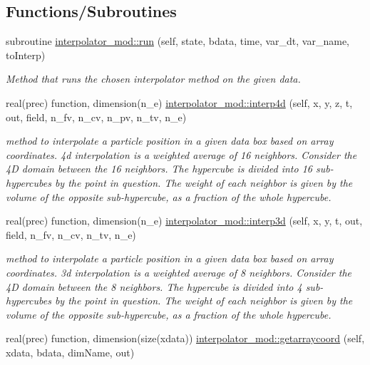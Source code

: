 \subsection*{Functions/\+Subroutines}
\begin{DoxyCompactItemize}
\item 
subroutine \mbox{\hyperlink{namespaceinterpolator__mod_aeb33b9e901668a304b49a9cc7e42969c}{interpolator\+\_\+mod\+::run}} (self, state, bdata, time, var\+\_\+dt, var\+\_\+name, to\+Interp)
\begin{DoxyCompactList}\small\item\em Method that runs the chosen interpolator method on the given data. \end{DoxyCompactList}\item 
real(prec) function, dimension(n\+\_\+e) \mbox{\hyperlink{namespaceinterpolator__mod_a4d21fa0242d7cf7742a44d85314ec183}{interpolator\+\_\+mod\+::interp4d}} (self, x, y, z, t, out, field, n\+\_\+fv, n\+\_\+cv, n\+\_\+pv, n\+\_\+tv, n\+\_\+e)
\begin{DoxyCompactList}\small\item\em method to interpolate a particle position in a given data box based on array coordinates. 4d interpolation is a weighted average of 16 neighbors. Consider the 4D domain between the 16 neighbors. The hypercube is divided into 16 sub-\/hypercubes by the point in question. The weight of each neighbor is given by the volume of the opposite sub-\/hypercube, as a fraction of the whole hypercube. \end{DoxyCompactList}\item 
real(prec) function, dimension(n\+\_\+e) \mbox{\hyperlink{namespaceinterpolator__mod_a15031a389a46159257dd4c2b15174a0b}{interpolator\+\_\+mod\+::interp3d}} (self, x, y, t, out, field, n\+\_\+fv, n\+\_\+cv, n\+\_\+tv, n\+\_\+e)
\begin{DoxyCompactList}\small\item\em method to interpolate a particle position in a given data box based on array coordinates. 3d interpolation is a weighted average of 8 neighbors. Consider the 4D domain between the 8 neighbors. The hypercube is divided into 4 sub-\/hypercubes by the point in question. The weight of each neighbor is given by the volume of the opposite sub-\/hypercube, as a fraction of the whole hypercube. \end{DoxyCompactList}\item 
real(prec) function, dimension(size(xdata)) \mbox{\hyperlink{namespaceinterpolator__mod_aa0ec274fefa309bd1aea4b1b81ad43e1}{interpolator\+\_\+mod\+::getarraycoord}} (self, xdata, bdata, dim\+Name, out)

\end{DoxyCompactItemize}
